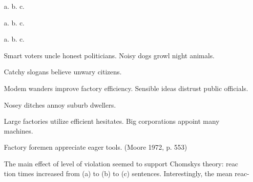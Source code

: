 \begin{multicols}{2}
\setcounter{listWWNumliileveli}{2}
\begin{listWWNumliileveli}
\item 
\begin{styleStandard}
a. b. c.
\end{styleStandard}


\end{listWWNumliileveli}
\setcounter{listWWNumlleveli}{4}
\begin{listWWNumlleveli}
\item 
\begin{styleStandard}
a. b. c.
\end{styleStandard}


\item 
\begin{styleStandard}
a. b. c.
\end{styleStandard}


\end{listWWNumlleveli}
\begin{styleStandard}
Smart voters uncle honest politicians. Noisy dogs growl night animals.
\end{styleStandard}


\begin{styleStandard}
Catchy slogans believe unwary citizens.
\end{styleStandard}


\begin{styleStandard}
Modem wanders improve factory efficiency. Sensible ideas distrust public officials.
\end{styleStandard}


\begin{styleStandard}
Nosey ditches annoy suburb dwellers.
\end{styleStandard}


\begin{styleStandard}
Large factories utilize efficient hesitates. Big corporations appoint many machines.
\end{styleStandard}


\begin{styleStandard}
Factory foremen appreciate eager tools. (Moore 1972, p. 553)
\end{styleStandard}


\end{multicols}
\begin{styleStandard}
The main effect of level of violation seemed to support Chomsky{\textquotesingle}s theory: reac\- tion times increased from (a) to (b) to (c) sentences. Interestingly, the mean reac-
\end{styleStandard}


